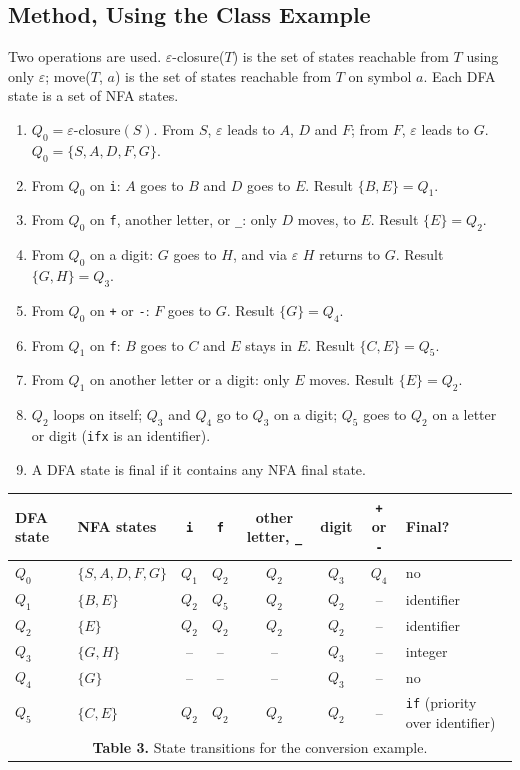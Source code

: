 \documentclass[12pt,letterpaper]{article}
\newcommand{\cd}[1]{\texttt{#1}}                       %
\begin{document}
\subsection{Method, Using the Class Example}

Two operations are used. $\varepsilon$-closure($T$) is the set of states reachable from $T$ using only $\varepsilon$; move($T$, $a$) is the set of states reachable from $T$ on symbol $a$. Each DFA state is a set of NFA states.

\begin{enumerate}
    \item $Q_0 = \varepsilon\text{-closure}(S)$. From $S$, $\varepsilon$ leads to $A$, $D$ and $F$; from $F$, $\varepsilon$ leads to $G$. $Q_0 = \{S, A, D, F, G\}$.
    \item From $Q_0$ on \cd{i}: $A$ goes to $B$ and $D$ goes to $E$. Result $\{B, E\} = Q_1$.
    \item From $Q_0$ on \cd{f}, another letter, or \cd{\_}: only $D$ moves, to $E$. Result $\{E\} = Q_2$.
    \item From $Q_0$ on a digit: $G$ goes to $H$, and via $\varepsilon$ $H$ returns to $G$. Result $\{G, H\} = Q_3$.
    \item From $Q_0$ on \cd{+} or \cd{-}: $F$ goes to $G$. Result $\{G\} = Q_4$.
    \item From $Q_1$ on \cd{f}: $B$ goes to $C$ and $E$ stays in $E$. Result $\{C, E\} = Q_5$.
    \item From $Q_1$ on another letter or a digit: only $E$ moves. Result $\{E\} = Q_2$.
    \item $Q_2$ loops on itself; $Q_3$ and $Q_4$ go to $Q_3$ on a digit; $Q_5$ goes to $Q_2$ on a letter or digit (\cd{ifx} is an identifier).
    \item A DFA state is final if it contains any NFA final state.
\end{enumerate}

\begin{center}
\small
\begin{tabularx}{\textwidth}{@{}l l c c c c c X@{}}
\toprule
\textbf{DFA state} & \textbf{NFA states} & \cd{i} & \cd{f} & \textbf{other letter, \cd{\_}} & \textbf{digit} & \cd{+} or \cd{-} & \textbf{Final?} \\
\midrule
$Q_0$ & $\{S, A, D, F, G\}$ & $Q_1$ & $Q_2$ & $Q_2$ & $Q_3$ & $Q_4$ & no \\
$Q_1$ & $\{B, E\}$ & $Q_2$ & $Q_5$ & $Q_2$ & $Q_2$ & -- & identifier \\
$Q_2$ & $\{E\}$ & $Q_2$ & $Q_2$ & $Q_2$ & $Q_2$ & -- & identifier \\
$Q_3$ & $\{G, H\}$ & -- & -- & -- & $Q_3$ & -- & integer \\
$Q_4$ & $\{G\}$ & -- & -- & -- & $Q_3$ & -- & no \\
$Q_5$ & $\{C, E\}$ & $Q_2$ & $Q_2$ & $Q_2$ & $Q_2$ & -- & \cd{if} (priority over identifier) \\
\bottomrule
\multicolumn{8}{c}{\vspace{2pt}\footnotesize \textbf{Table 3.} State transitions for the conversion example.} \\
\end{tabularx}
\end{center}
\end{document}
